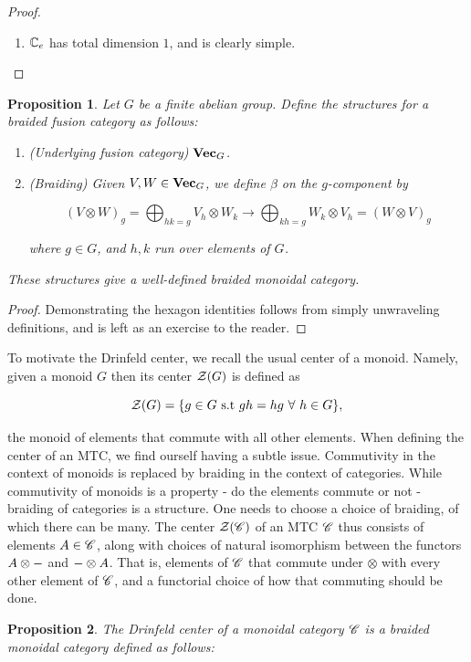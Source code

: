 \documentclass{article}
\newtheorem{proposition}{Proposition}[section]
\theoremstyle{definition}
\numberwithin{figure}{section}
\begin{document}
\begin{enumerate}[\thesection .1.]
\begin{proof}
\begin{enumerate}
\item $\mathbb{C}_e$ has total dimension $1$, and is clearly simple.

\end{enumerate}
\end{proof}

\begin{proposition} Let $G$ be a finite abelian group. Define the structures for a braided fusion category as follows:

\begin{enumerate}
\item (Underlying fusion category) $\bold{Vec}_G$.
\item (Braiding) Given $V,W\in \bold{Vec}_G$, we define $\beta$ on the $g$-component by

$$\left(V\otimes W\right)_g = \bigoplus_{hk=g}V_h\otimes W_k \xrightarrow{} \bigoplus_{kh=g}W_k\otimes V_h=\left(W\otimes V\right)_g$$

where $g\in G$, and $h,k$ run over elements of $G$.
\end{enumerate}

These structures give a well-defined braided monoidal category.
\end{proposition}
\begin{proof} Demonstrating the hexagon identities follows from simply unwraveling definitions, and is left as an exercise to the reader.
\end{proof}


To motivate the Drinfeld center, we recall the usual center of a monoid. Namely, given a monoid $G$ then its center $\mathcal{Z}(G)$ is defined as

$$\mathcal{Z}(G)=\{g\in G \,\,\mathrm{s.t}\,\, gh=hg\,\,\forall\,\, h\in G\},$$

the monoid of elements that commute with all other elements. When defining the center of an MTC, we find ourself having a subtle issue. Commutivity in the context of monoids is replaced by braiding in the context of categories. While commutivity of monoids is a property - do the elements commute or not - braiding of categories is a structure. One needs to choose a choice of braiding, of which there can be many. The center $\mathcal{Z}(\mathscr{C})$ of an MTC $\mathscr{C}$ thus consists of elements $A\in \mathscr{C}$, along with choices of natural isomorphism between the functors $A\otimes \--$ and $\-- \otimes A$. That is, elements of $\mathscr{C}$ that commute under $\otimes$ with every other element of $\mathscr{C}$, and a functorial choice of how that commuting should be done.

\begin{proposition} The Drinfeld center of a monoidal category $\mathscr{C}$ is a braided monoidal category defined as follows:


\end{proposition}
\end{enumerate}
\end{document}
